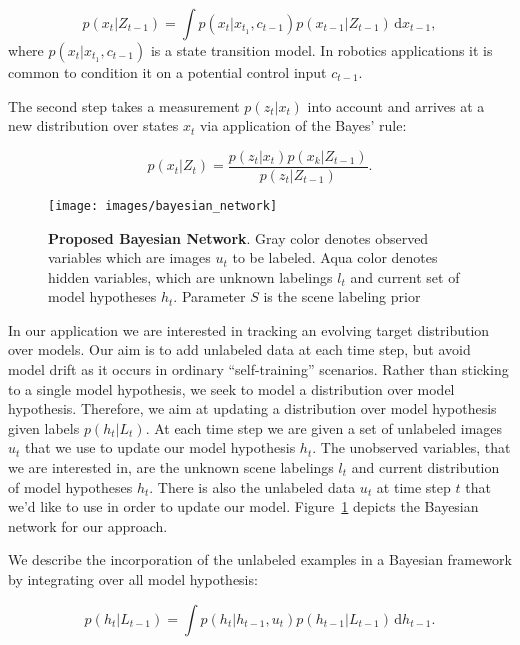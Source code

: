 \begin{equation}
p(x_t | Z_{t-1}) = \int p(x_t | x_{t_1}, c_{t-1}) p(x_{t-1} | Z_{t-1})\,\mathrm{d}x_{t-1},
\end{equation}
where $p(x_t | x_{t_1}, c_{t-1})$ is a state transition model. In robotics applications it is common to condition it on a potential control input $c_{t-1}$.

The second step takes a measurement $p(z_t|x_t)$ into account and arrives at a new distribution over states $x_t$ via application of the Bayes' rule:

\begin{equation}
p(x_t | Z_t) = \frac{p(z_t|x_t) p(x_k | Z_{t-1})}{p(z_t|Z_{t-1})}.
\end{equation}

\begin{figure}[t]
 \centering
 \texttt{[image: images/bayesian\_network]}
 \caption[Proposed Bayesian Network]{
 {\bf Proposed Bayesian Network}.
 Gray color denotes observed variables which are images $u_t$ to be labeled. Aqua color denotes hidden variables, which are unknown labelings $l_t$
 and current set of model hypotheses $h_t$. Parameter $S$ is the scene labeling prior}
 \label{fig:bayesian_network}
\end{figure}

In our application we are interested in tracking an evolving target distribution over models. Our aim is to add unlabeled data at each 
time step, but avoid model drift as it occurs in ordinary ``self-training'' scenarios. Rather than sticking to a single model hypothesis, 
we seek to model a distribution over model hypothesis. Therefore, we aim at updating a distribution over model hypothesis given labels $p(h_t|L_t)$. 
At each time step we are given a set of unlabeled images $u_t$ that we use to update our model hypothesis $h_t$. The unobserved variables, that we are 
interested in, are the unknown scene labelings $l_t$ and current distribution of model hypotheses $h_t$. There is also the unlabeled data $u_t$ at time step 
$t$ that we'd like to use in order to update our model. Figure~\ref{fig:bayesian_network} depicts the Bayesian network for our approach.

We describe the incorporation of the unlabeled examples in a Bayesian framework by integrating over all model hypothesis:

\begin{equation}
p(h_t | L_{t-1}) = \int p(h_t | h_{t-1}, u_{t}) p(h_{t-1} | L_{t-1})\,\mathrm{d}h_{t-1}.
\end{equation}

